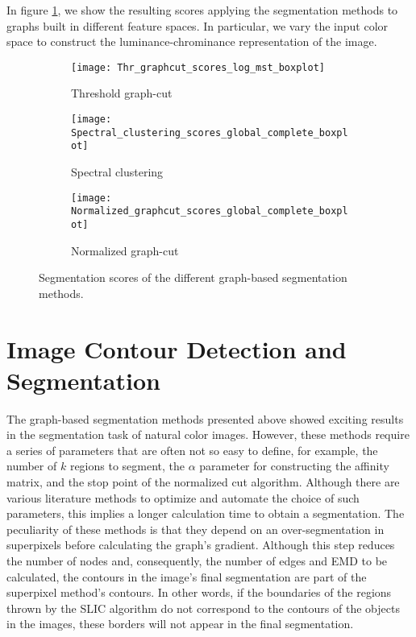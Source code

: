 In figure \ref{fig:boxplot_score_methods}, we show the resulting scores applying the segmentation methods to graphs built in different feature spaces. In particular, we vary the input color space to construct the luminance-chrominance representation of the image.

\begin{figure}[!ht]
    \centering
    \begin{subfigure}[b]{0.49\textwidth}
        \texttt{[image: Thr\_graphcut\_scores\_log\_mst\_boxplot]}
        \caption{Threshold graph-cut}
    \end{subfigure}     
    \begin{subfigure}[b]{0.49\textwidth}
    	\centering
    	\texttt{[image: Spectral\_clustering\_scores\_global\_complete\_boxplot]}
        \caption{Spectral clustering}
    \end{subfigure}     
    \begin{subfigure}[b]{0.49\textwidth}
    	\centering
        \texttt{[image: Normalized\_graphcut\_scores\_global\_complete\_boxplot]}
        \caption{Normalized graph-cut}
    \end{subfigure} 
        	    
    \caption{Segmentation scores of the different graph-based segmentation methods.}\label{fig:boxplot_score_methods}    
\end{figure}

\section{Image Contour Detection and Segmentation}

The graph-based segmentation methods presented above showed exciting results in the segmentation task of natural color images. However, these methods require a series of parameters that are often not so easy to define, for example, the number of $k$ regions to segment, the $\alpha$ parameter for constructing the affinity matrix, and the stop point of the normalized cut algorithm. Although there are various literature methods to optimize and automate the choice of such parameters, this implies a longer calculation time to obtain a segmentation. The peculiarity of these methods is that they depend on an over-segmentation in superpixels before calculating the graph's gradient. Although this step reduces the number of nodes and, consequently, the number of edges and EMD to be calculated, the contours in the image's final segmentation are part of the superpixel method's contours. In other words, if the boundaries of the regions thrown by the SLIC algorithm do not correspond to the contours of the objects in the images, these borders will not appear in the final segmentation. 

